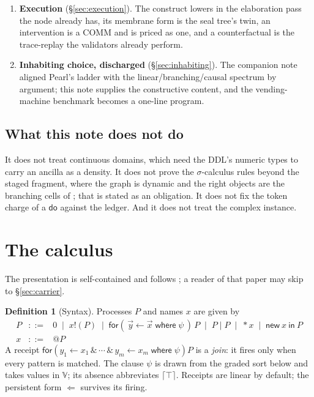 \documentclass[11pt,a4paper]{article}
\theoremstyle{plain}
\theoremstyle{definition}
\newtheorem{definition}[theorem]{Definition}
\theoremstyle{remark}
\newcommand{\V}{\mathbb{V}}
\newcommand{\crisp}[1]{\lceil #1 \rceil}
\newcommand{\dok}{\textsf{do}}
\newcommand{\ink}{\textsf{in}}
\newcommand{\fork}{\textsf{for}}
\newcommand{\where}{\textsf{where}}
\begin{document}
\begin{enumerate}[leftmargin=1.4em,itemsep=3pt]
permanent-shaped renormalisation of contention sets; vacuity of a $\dok$ is a
reachability question. We grade the constraint language into four fragments by
evaluation cost and impose four type disciplines on the scope under which
lowering is exact and the semantics is Pearl's
(Proposition~\ref{prop:practical}).
\item \textbf{Execution} (\S\ref{sec:execution}). The construct lowers in the
elaboration pass the node already has, its membrane form is the seal tree's
twin, an intervention is a COMM and is priced as one, and a counterfactual is
the trace-replay the validators already perform.
\item \textbf{Inhabiting choice, discharged} (\S\ref{sec:inhabiting}). The
companion note \cite{Inhabiting} aligned Pearl's ladder with the
linear/branching/causal spectrum by argument; this note supplies the
constructive content, and the vending-machine benchmark becomes a one-line
program.
\end{enumerate}

\subsection{What this note does not do}

It does not treat continuous domains, which need the DDL's numeric types to
carry an ancilla as a density. It does not prove the $\sigma$-calculus rules
beyond the staged fragment, where the graph is dynamic and the right objects
are the branching cells of \cite{AbbesBenveniste}; that is stated as an
obligation. It does not fix the token charge of a $\dok$ against the ledger. And
it does not treat the complex instance.

\section{The calculus}\label{sec:calculus}

The presentation is self-contained and follows \cite{GradedPLN}; a reader of
that paper may skip to \S\ref{sec:carrier}.

\begin{definition}[Syntax]\label{def:syntax}
Processes $P$ and names $x$ are given by
\[
\begin{array}{rcl}
P &::=& 0 \;\mid\; x!(P) \;\mid\; \fork(\,\vec{y} \leftarrow \vec{x}
  \;\where\; \psi\,)\,P \;\mid\; P \mid P \;\mid\; *x
  \;\mid\; \textsf{new}\ x\ \ink\ P \\[2pt]
x &::=& @P
\end{array}
\]
A receipt $\fork(y_1 \leftarrow x_1 \,\&\, \cdots \,\&\, y_m \leftarrow x_m
\;\where\; \psi)P$ is a \emph{join}: it fires only when every pattern is matched.
The clause $\psi$ is drawn from the graded sort below and takes values in $\V$;
its absence abbreviates $\crisp{\top}$. Receipts are linear by default; the
persistent form $\Leftarrow$ survives its firing.
\end{definition}
\end{document}
